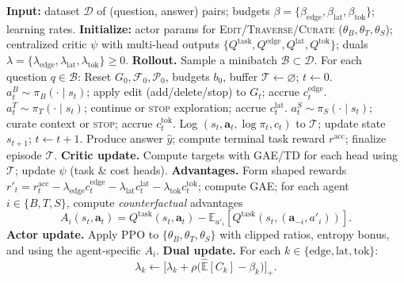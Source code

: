 \documentclass{article} %
\newcommand{\method}{\textsc{CLAUSE}\xspace}
\begin{document}
\begin{algorithm}[H]
\caption{\method: Training with a constrained centralized\mbox{-}critic PPO (LC\mbox{-}MAPPO)}
\label{alg:lc2}
\begin{algorithmic}[1]
\State \textbf{Input:} dataset $\mathcal{D}$ of (question, answer) pairs; budgets $\beta=\{\beta_{\text{edge}},\beta_{\text{lat}},\beta_{\text{tok}}\}$; learning rates.
\State \textbf{Initialize:} actor params for \textsc{Edit}/\textsc{Traverse}/\textsc{Curate} ($\theta_B,\theta_T,\theta_S$); centralized critic $\psi$ with multi\mbox{-}head outputs $\{Q^{\text{task}},Q^{\text{edge}},Q^{\text{lat}},Q^{\text{tok}}\}$; duals $\lambda=\{\lambda_{\text{edge}},\lambda_{\text{lat}},\lambda_{\text{tok}}\}\!\ge\!0$.
  \State \textbf{Rollout.} Sample a minibatch $\mathcal{B}\!\subset\!\mathcal{D}$. For each question $q\!\in\!\mathcal{B}$:
  \State \quad Reset $G_0,\mathcal{F}_0,\mathcal{P}_0$, budgets $b_0$, buffer $\mathcal{T}\!\leftarrow\!\varnothing$; $t\!\leftarrow\!0$.
    \State \quad $a^B_t\!\sim\!\pi_B(\cdot\mid s_t)$; apply edit (add/delete/stop) to $G_t$; accrue $c^{\text{edge}}_t$.
    \State \quad $a^T_t\!\sim\!\pi_T(\cdot\mid s_t)$; continue or \textsc{stop} exploration; accrue $c^{\text{lat}}_t$.
    \State \quad $a^S_t\!\sim\!\pi_S(\cdot\mid s_t)$; curate context or \textsc{stop}; accrue $c^{\text{tok}}_t$.
    \State \quad Log $(s_t,\mathbf{a}_t,\log\pi_t,c_t)$ to $\mathcal{T}$; update state $s_{t+1}$; $t\!\leftarrow\!t{+}1$.
  \EndWhile
  \State \quad Produce answer $\hat{y}$; compute terminal task reward $r^{\text{acc}}$; finalize episode $\mathcal{T}$.
  \State \textbf{Critic update.} Compute targets with GAE/TD for each head using $\mathcal{T}$; update $\psi$ (task \& cost heads).
  \State \textbf{Advantages.} Form shaped rewards $r'_t \!=\! r^{\text{acc}}_t - \lambda_{\text{edge}}c^{\text{edge}}_t - \lambda_{\text{lat}}c^{\text{lat}}_t - \lambda_{\text{tok}}c^{\text{tok}}_t$; compute GAE; for each agent $i\!\in\!\{B,T,S\}$, compute \emph{counterfactual} advantages
  \[
      A_i(s_t,\mathbf{a}_t)=Q^{\text{task}}(s_t,\mathbf{a}_t)-\mathbb{E}_{a'_i}\!\left[Q^{\text{task}}\!\left(s_t,(\mathbf{a}_{-i},a'_i)\right)\right].
  \]
  \State \textbf{Actor update.} Apply PPO to $\{\theta_B,\theta_T,\theta_S\}$ with clipped ratios, entropy bonus, and using the agent-specific $A_i$.
  \State \textbf{Dual update.} For each $k\!\in\!\{\text{edge},\text{lat},\text{tok}\}$:
  \[
      \lambda_k \leftarrow \big[\lambda_k + \rho\big(\widehat{\mathbb{E}}[C_k]-\beta_k\big)\big]_+.
  \]
\EndFor
\end{algorithmic}
\end{algorithm}
\end{document}
